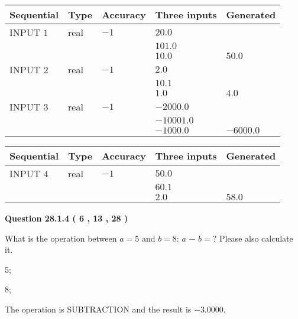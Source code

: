 \documentclass[12pt]{article}
\begin{document}
  
\noindent\begin{tabular}{|l|l|l|l|l|}
\hline
 Sequential & Type & Accuracy & Three inputs & Generated \\ 
\hline
 
 
  INPUT $            1 $ & real & $           -1  $ & $
 20.0
  $ & \\
  & & &  $
 101.0
  $ & \\
  & & &  $
 10.0
 $ & $ 50.0 $ 
 \\  \hline  
 
 
  INPUT $            2 $ & real & $           -1  $ & $
 2.0
  $ & \\
  & & &  $
 10.1
  $ & \\
  & & &  $
 1.0
 $ & $ 4.0 $ 
 \\  \hline  
 
 
  INPUT $            3 $ & real & $           -1  $ & $
 -2000.0
  $ & \\
  & & &  $
 -10001.0
  $ & \\
  & & &  $
 -1000.0
 $ & $ -6000.0 $ 
 \\  \hline  
 \end{tabular}
   
   
  
  
\noindent\begin{tabular}{|l|l|l|l|l|}
\hline
 Sequential & Type & Accuracy & Three inputs & Generated \\ 
\hline
 
 
  INPUT $            4 $ & real & $           -1  $ & $
 50.0
  $ & \\
  & & &  $
 60.1
  $ & \\
  & & &  $
 2.0
 $ & $ 58.0 $ 
 \\  \hline  
 \end{tabular}
   
   
  
\vspace{0.2in}
  
{\textbf{\Large{Question
28.1.4 
 (           6 ,          13 ,          28 )
}}}
  
  
What is the operation between $a= %
5$ and $b= %
8$:
$a$  %
$-$ $b=?$ Please also calculate it.
 
 
\noindent{}
 
 

5;
 
8;
 
The operation is  %
SUBTRACTION and the result is
$ %
-3.0000$.
 
\end{document}
